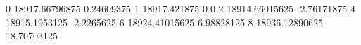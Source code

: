 0 18917.66796875 0.24609375
1 18917.421875 0.0
2 18914.66015625 -2.76171875
4 18915.1953125 -2.2265625
6 18924.41015625 6.98828125
8 18936.12890625 18.70703125
